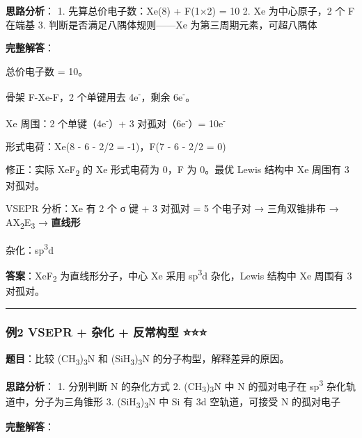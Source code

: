 \documentclass[a4paper,11pt]{ctexart}
\begin{document}
\textbf{思路分析}：
1. 先算总价电子数：Xe(8) + F(1×2) = 10
2. Xe 为中心原子，2 个 F 在端基
3. 判断是否满足八隅体规则------Xe 为第三周期元素，可超八隅体

\textbf{完整解答}：

总价电子数 = 10。

骨架 F-Xe-F，2 个单键用去 4e\textsuperscript{-}，剩余 6e\textsuperscript{-}。

Xe 周围：2 个单键（4e\textsuperscript{-}）+ 3 对孤对（6e\textsuperscript{-}）= 10e\textsuperscript{-}

形式电荷：Xe(8 - 6 - 2/2 = -1)，F(7 - 6 - 2/2 = 0)

修正：实际 XeF\textsubscript{2} 的 Xe 形式电荷为 0，F 为 0。最优 Lewis 结构中 Xe 周围有 3 对孤对。

VSEPR 分析：Xe 有 2 个 σ 键 + 3 对孤对 = 5 个电子对 → 三角双锥排布 → AX\textsubscript{2}E\textsubscript{3} → \textbf{直线形}

杂化：sp\textsuperscript{3}d

\textbf{答案}：XeF\textsubscript{2} 为直线形分子，中心 Xe 采用 sp\textsuperscript{3}d 杂化，Lewis 结构中 Xe 周围有 3 对孤对。

\begin{center}\rule{0.5\linewidth}{0.5pt}\end{center}

\subsubsection{例2 VSEPR + 杂化 + 反常构型 ⭐⭐⭐}\label{ux4f8b2-vsepr-ux6742ux5316-ux53cdux5e38ux6784ux578b}

\textbf{题目}：比较 (CH\textsubscript{3})\textsubscript{3}N 和 (SiH\textsubscript{3})\textsubscript{3}N 的分子构型，解释差异的原因。

\textbf{思路分析}：
1. 分别判断 N 的杂化方式
2. (CH\textsubscript{3})\textsubscript{3}N 中 N 的孤对电子在 sp\textsuperscript{3} 杂化轨道中，分子为三角锥形
3. (SiH\textsubscript{3})\textsubscript{3}N 中 Si 有 3d 空轨道，可接受 N 的孤对电子

\textbf{完整解答}：
\end{document}
